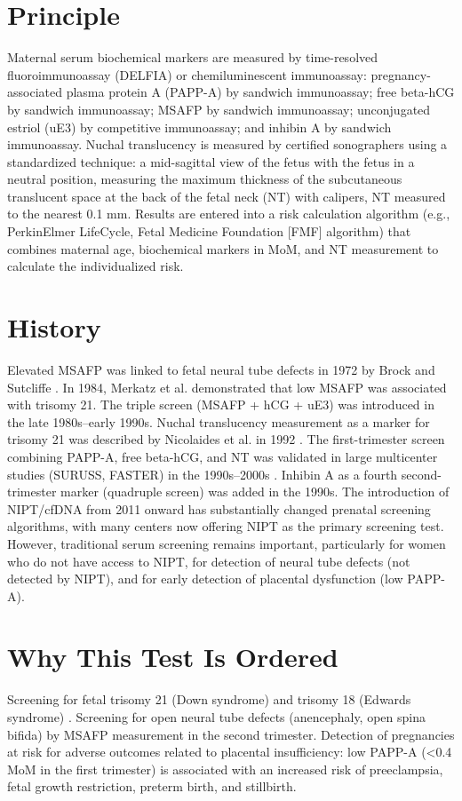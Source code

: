 \section*{Principle}
Maternal serum biochemical markers are measured by time-resolved fluoroimmunoassay (DELFIA) or chemiluminescent immunoassay: pregnancy-associated plasma protein A (PAPP-A) by sandwich immunoassay; free beta-hCG by sandwich immunoassay; MSAFP by sandwich immunoassay; unconjugated estriol (uE3) by competitive immunoassay; and inhibin A by sandwich immunoassay. Nuchal translucency is measured by certified sonographers using a standardized technique: a mid-sagittal view of the fetus with the fetus in a neutral position, measuring the maximum thickness of the subcutaneous translucent space at the back of the fetal neck (NT) with calipers, NT measured to the nearest 0.1 mm. Results are entered into a risk calculation algorithm (e.g., PerkinElmer LifeCycle, Fetal Medicine Foundation [FMF] algorithm) that combines maternal age, biochemical markers in MoM, and NT measurement to calculate the individualized risk.

\section*{History}
Elevated MSAFP was linked to fetal neural tube defects in 1972 by Brock and Sutcliffe \cite{brock1972alpha}. In 1984, Merkatz et al. demonstrated that low MSAFP was associated with trisomy 21. The triple screen (MSAFP + hCG + uE3) was introduced in the late 1980s--early 1990s. Nuchal translucency measurement as a marker for trisomy 21 was described by Nicolaides et al. in 1992 \cite{nicolaides1992fetal}. The first-trimester screen combining PAPP-A, free beta-hCG, and NT was validated in large multicenter studies (SURUSS, FASTER) in the 1990s--2000s \cite{nicolaides2005multicenter}. Inhibin A as a fourth second-trimester marker (quadruple screen) was added in the 1990s. The introduction of NIPT/cfDNA from 2011 onward has substantially changed prenatal screening algorithms, with many centers now offering NIPT as the primary screening test. However, traditional serum screening remains important, particularly for women who do not have access to NIPT, for detection of neural tube defects (not detected by NIPT), and for early detection of placental dysfunction (low PAPP-A).

\section*{Why This Test Is Ordered}
Screening for fetal trisomy 21 (Down syndrome) and trisomy 18 (Edwards syndrome) \cite{acog2016screening}. Screening for open neural tube defects (anencephaly, open spina bifida) by MSAFP measurement in the second trimester. Detection of pregnancies at risk for adverse outcomes related to placental insufficiency: low PAPP-A (<0.4 MoM in the first trimester) is associated with an increased risk of preeclampsia, fetal growth restriction, preterm birth, and stillbirth.

